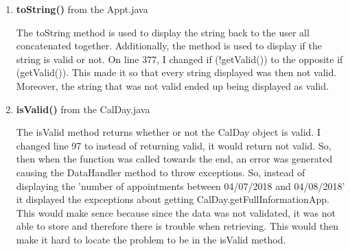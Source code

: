 \documentclass[12pt]{article}
\begin{document}
\begin{enumerate}
\item \textbf{toString()} from the Appt.java
\begin{flushleft}
The toString method is used to display the string back to the user all concatenated together. Additionally, the method is used to display if the string is valid or not. On line 377, I changed if (!getValid()) to the opposite if (getValid()). This made it so that every string displayed was then not valid. Moreover, the string that was not valid ended up being displayed as valid. 
\end{flushleft}

\item \textbf{isValid()} from the CalDay.java 
\begin{flushleft}
The isValid method returns whether or not the CalDay object is valid. I changed line 97 to instead of returning valid, it would return not valid. So, then when the function was called towards the end, an error was generated causing the DataHandler method to throw exceptions. So, instead of displaying the 'number of appointments between 04/07/2018 and 04/08/2018' it displayed the expceptions about getting CalDay.getFullInformationApp. This would make sence because since the data was not validated, it was not able to store and therefore there is trouble when retrieving. This would then make it hard to locate the problem to be in the isValid method. 
\end{flushleft}


\end{enumerate}
\end{document}
